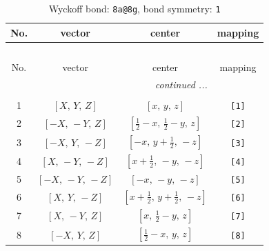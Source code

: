 \documentclass[fleqn,8pt]{jsarticle}
\begin{document}
\begin{longtable}{cccc}
\caption{Wyckoff bond: {\tt 8a@8g}, bond symmetry: {\tt 1}}
 \\
 \hline \hline
No. & vector & center & mapping \\ \hline \endfirsthead

\multicolumn{3}{l}{\tablename\ \thetable{}} \\
 \hline \hline
No. & vector & center & mapping \\ \hline \endhead

 \hline \hline
\multicolumn{3}{r}{\footnotesize\it continued ...} \\ \endfoot

 \hline \hline
\multicolumn{3}{r}{} \\ \endlastfoot

1 & $\left[ X,\, Y,\, Z \right]$ & $\left[ x,\, y,\, z \right]$ & {\tt [1]} \\ \hline
2 & $\left[ - X,\, - Y,\, Z \right]$ & $\left[ \frac{1}{2} - x,\, \frac{1}{2} - y,\, z \right]$ & {\tt [2]} \\ \hline
3 & $\left[ - X,\, Y,\, - Z \right]$ & $\left[ - x,\, y + \frac{1}{2},\, - z \right]$ & {\tt [3]} \\ \hline
4 & $\left[ X,\, - Y,\, - Z \right]$ & $\left[ x + \frac{1}{2},\, - y,\, - z \right]$ & {\tt [4]} \\ \hline
5 & $\left[ - X,\, - Y,\, - Z \right]$ & $\left[ - x,\, - y,\, - z \right]$ & {\tt [5]} \\ \hline
6 & $\left[ X,\, Y,\, - Z \right]$ & $\left[ x + \frac{1}{2},\, y + \frac{1}{2},\, - z \right]$ & {\tt [6]} \\ \hline
7 & $\left[ X,\, - Y,\, Z \right]$ & $\left[ x,\, \frac{1}{2} - y,\, z \right]$ & {\tt [7]} \\ \hline
8 & $\left[ - X,\, Y,\, Z \right]$ & $\left[ \frac{1}{2} - x,\, y,\, z \right]$ & {\tt [8]} \\
\end{longtable}
\end{document}
